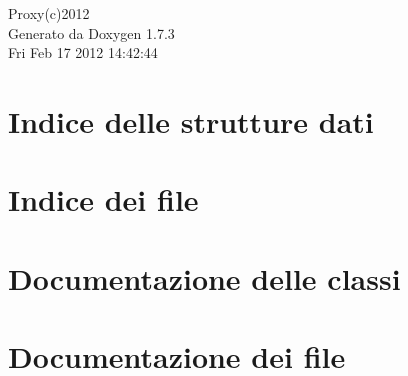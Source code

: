 \documentclass[a4paper]{book}
\begin{document}
\hypersetup{pageanchor=false}
\begin{titlepage}
\vspace*{7cm}
\begin{center}
{\Large Proxy(c)2012 }\\
\vspace*{1cm}
{\large Generato da Doxygen 1.7.3}\\
\vspace*{0.5cm}
{\small Fri Feb 17 2012 14:42:44}\\
\end{center}
\end{titlepage}
\clearemptydoublepage
{}
\tableofcontents
\clearemptydoublepage
{}
\hypersetup{pageanchor=true}
\chapter{Indice delle strutture dati}

\chapter{Indice dei file}

\chapter{Documentazione delle classi}















\chapter{Documentazione dei file}





































\printindex
\end{document}
